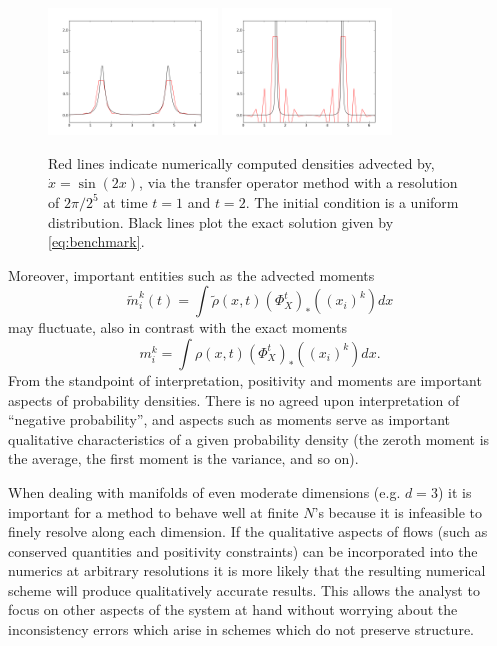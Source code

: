 \documentclass[letterpaper, 12 pt]{amsart}
\begin{document}
  \begin{figure}[h!]
	\centering
  	\includegraphics[width=0.4\textwidth]{./images/transfer_op_t1_00.png}
  	\includegraphics[width=0.4\textwidth]{./images/transfer_op_t2_00.png}
	\caption{Red lines indicate numerically computed densities advected by, $\dot{x} = \sin(2x)$, via the transfer operator method with a resolution of $2\pi / 2^5$
		at time $t=1$ and $t=2$. The initial condition is a uniform distribution.
		Black lines plot the exact solution given by \eqref{eq:benchmark}.}
	\label{fig:transfer_op}
\end{figure}
  
  Moreover, important entities such as the advected moments
  $$\tilde{m}^k_i(t) = \int \tilde{\rho}(x,t) (\Phi_X^t)_*((x_i)^k)dx$$
  may fluctuate, also in contrast with the exact moments
  $$m^k_i = \int \rho(x,t)  (\Phi_X^t)_*((x_i)^k) dx.$$
  From the standpoint of interpretation, positivity and moments are important
  aspects of probability densities.  There is no agreed upon interpretation of
  ``negative probability'', and aspects such as moments serve as important
  qualitative characteristics of a given probability density (the zeroth moment
  is the average, the first moment is the variance, and so on).
  
  When dealing with manifolds of even moderate dimensions
  (e.g. $d=3$) it is important for a method to behave well at finite $N$'s
  because it is infeasible to finely resolve along each dimension.
  If the qualitative aspects of flows (such as conserved quantities and positivity
  constraints) can be incorporated into the numerics at arbitrary resolutions
  it is more likely that the resulting numerical scheme will produce qualitatively
  accurate results.
  This allows the analyst to focus on other aspects of the system at hand
  without worrying about the inconsistency errors which arise in schemes
  which do not preserve structure.
\end{document}
